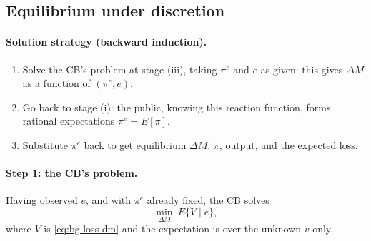 \subsection{Equilibrium under discretion }

\paragraph{Solution strategy (backward induction).}
\begin{enumerate}
  \item Solve the CB's problem at stage (iii), taking $\pi^e$ and $e$ as given: this gives $\Delta M$ as a function of $(\pi^e,e)$.
  \item Go back to stage (i): the public, knowing this reaction function, forms rational expectations $\pi^e=E[\pi]$.
  \item Substitute $\pi^e$ back to get equilibrium $\Delta M$, $\pi$, output, and the expected loss.
\end{enumerate}

\paragraph{Step 1: the CB's problem.} Having observed $e$, and with $\pi^e$ already fixed, the CB solves
\[
\min_{\Delta M}\ E\{V\mid e\},
\]
where $V$ is \eqref{eq:bg-loss-dm} and the expectation is over the unknown $v$ only.

